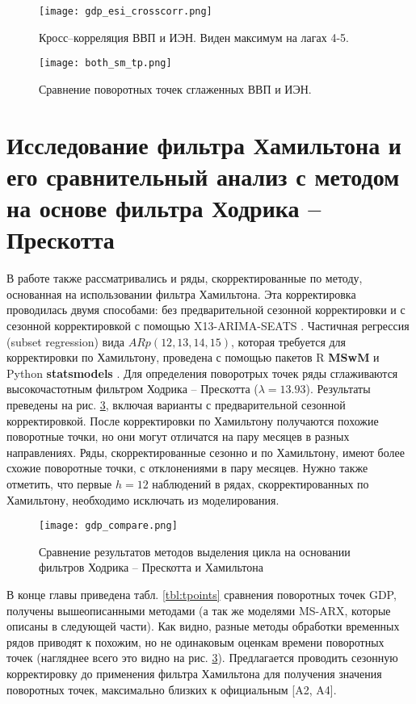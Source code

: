 \documentclass[a4paper,14pt]{extreport}
\begin{document}
	\begin{figure}
		\label{fig:ccf}
		\texttt{[image: gdp\_esi\_crosscorr.png]}
		\caption{Кросс–корреляция ВВП и ИЭН. Виден максимум на лагах 4-5.}
	\end{figure}	
	
	\begin{figure}
		\label{fig:hp-ptcompare}
		\texttt{[image: both\_sm\_tp.png]}
		\caption{Сравнение поворотных точек сглаженных ВВП и ИЭН.}
	\end{figure}
	
	\section{Исследование фильтра Хамильтона и его сравнительный анализ с методом на основе фильтра Ходрика – Прескотта}
	В работе также рассматривались и ряды, скорректированные по методу, основанная на использовании фильтра Хамильтона. Эта корректировка проводилась двумя способами: без предварительной сезонной корректировки и с сезонной корректировкой с помощью X13-ARIMA-SEATS \cite{seasonalManual}. Частичная регрессия (subset regression) вида $ARp(12,13,14,15)$, которая требуется для корректировки по Хамильтону, проведена с помощью пакетов R \textbf{MSwM} и Python \textbf{statsmodels} \cite{statsmodels}. Для определения поворотрых точек ряды сглаживаются высокочастотным фильтром Ходрика – Прескотта ($\lambda=13.93$). Результаты преведены на рис. \ref{fig:gdp_compare}, включая варианты с предварительной сезонной корректировкой.  После корректировки по Хамильтону получаются похожие поворотные точки, но они могут отличатся на пару месяцев в разных направлениях. Ряды, скорректированные сезонно и по Хамильтону, имеют более схожие поворотные точки, с отклонениями в пару месяцев. Нужно также отметить, что первые $h=12$ наблюдений в рядах, скорректированных по Хамильтону, необходимо исключать из моделирования.
	
	
	\begin{figure}
		\label{fig:gdp_compare}
		\texttt{[image: gdp\_compare.png]}
		\caption{Сравнение результатов методов выделения цикла на основании 
			фильтров Ходрика – Прескотта и Хамильтона}	
	\end{figure}
	
	В конце главы приведена табл. \ref{tbl:tpoints} сравнения поворотных точек GDP, получены вышеописанными методами (а так же моделями MS-ARX, которые описаны в следующей части). Как видно, разные методы обработки временных рядов приводят к похожим, но не одинаковым оценкам времени поворотных точек (нагляднее всего это видно на рис. \ref{fig:gdp_compare}). Предлагается проводить сезонную корректировку до применения фильтра Хамильтона для получения значения поворотных точек, максимально близких к официальным [A2, A4]. \iffalse \cite{makarevich_hse_paper,makarevich_bsu_conf_2017}.\fi
	
\end{document}
